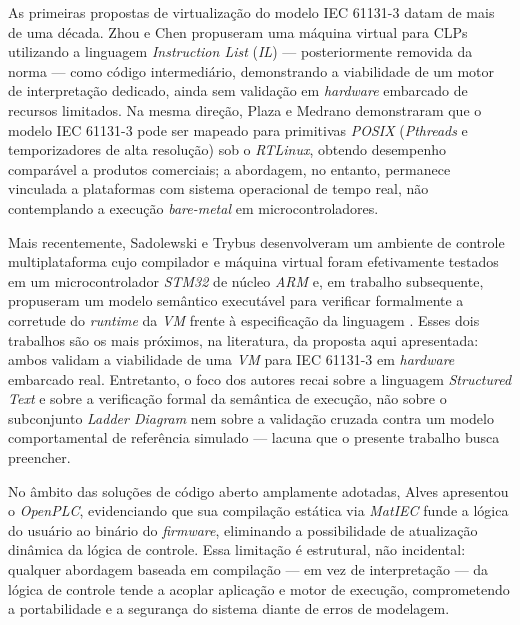As primeiras propostas de virtualização do modelo IEC 61131-3 datam de mais de uma década.
Zhou e Chen \cite{zhou:2009} propuseram uma máquina virtual para CLPs utilizando a linguagem \textit{Instruction List} (\textit{IL}) --- posteriormente removida da norma --- como código intermediário, demonstrando a viabilidade de um motor de interpretação dedicado, ainda sem validação em \textit{hardware} embarcado de recursos limitados.
Na mesma direção, Plaza e Medrano \cite{plaza:2006} demonstraram que o modelo IEC 61131-3 pode ser mapeado para primitivas \textit{POSIX} (\textit{Pthreads} e temporizadores de alta resolução) sob o \textit{RTLinux}, obtendo desempenho comparável a produtos comerciais; a abordagem, no entanto, permanece vinculada a plataformas com sistema operacional de tempo real, não contemplando a execução \textit{bare-metal} em microcontroladores.

Mais recentemente, Sadolewski e Trybus desenvolveram um ambiente de controle multiplataforma cujo compilador e máquina virtual foram efetivamente testados em um microcontrolador \textit{STM32} de núcleo \textit{ARM} \cite{sadolewski:2022} e, em trabalho subsequente, propuseram um modelo semântico executável para verificar formalmente a corretude do \textit{runtime} da \textit{VM} frente à especificação da linguagem \cite{sadolewski:2024}.
Esses dois trabalhos são os mais próximos, na literatura, da proposta aqui apresentada: ambos validam a viabilidade de uma \textit{VM} para IEC 61131-3 em \textit{hardware} embarcado real.
Entretanto, o foco dos autores recai sobre a linguagem \textit{Structured Text} e sobre a verificação formal da semântica de execução, não sobre o subconjunto \textit{Ladder Diagram} nem sobre a validação cruzada contra um modelo comportamental de referência simulado --- lacuna que o presente trabalho busca preencher.

No âmbito das soluções de código aberto amplamente adotadas, Alves \cite{alves:2018} apresentou o \textit{OpenPLC}, evidenciando que sua compilação estática via \textit{MatIEC} funde a lógica do usuário ao binário do \textit{firmware}, eliminando a possibilidade de atualização dinâmica da lógica de controle.
Essa limitação é estrutural, não incidental: qualquer abordagem baseada em compilação --- em vez de interpretação --- da lógica de controle tende a acoplar aplicação e motor de execução, comprometendo a portabilidade e a segurança do sistema diante de erros de modelagem.

